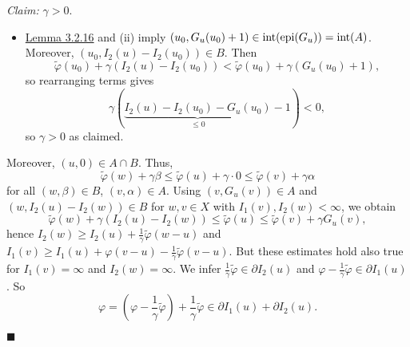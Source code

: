 \begin{itemize}
	\textit{Claim:} $\gamma>0$.
	\begin{itemize}
		\item[] \hyperlink{lemma_3_2_16}{Lemma 3.2.16} and (ii) imply $(u_0,G_u(u_0)+1)\in\operatorname{int}\mathopen{}\left(\operatorname{epi}\mathopen{}\left(G_u\right)\mathclose{}\right)\mathclose{}=\operatorname{int}\mathopen{}\left(A\right)\mathclose{}$. Moreover, $(u_0,I_2(u)-I_2(u_0))\in B$. Then
		\[\tilde{\varphi}(u_0)+\gamma(I_2(u)-I_2(u_0))<\tilde{\varphi}(u_0)+\gamma(G_u(u_0)+1),\]
		so rearranging terms gives
		\[\gamma(\underbrace{I_2(u)-I_2(u_0)-G_u(u_0)}_{\leq0}-1)<0,\]
		so $\gamma>0$ as claimed.
	\end{itemize}

	Moreover, $(u,0)\in A\cap B$. Thus,
	\[\tilde{\varphi}(w)+\gamma\beta\leq\tilde{\varphi}(u)+\gamma\cdot0\leq\tilde{\varphi}(v)+\gamma\alpha\]
	for all $(w,\beta)\in B$, $(v,\alpha)\in A$. Using $(v,G_u(v))\in A$ and $(w,I_2(u)-I_2(w))\in B$ for $w,v\in X$ with $I_1(v),I_2(w)<\infty$, we obtain
	\[\tilde{\varphi}(w)+\gamma(I_2(u)-I_2(w))\leq\tilde{\varphi}(u)\leq\tilde{\varphi}(v)+\gamma G_u(v),\]
	hence $I_2(w)\geq I_2(u)+\frac{1}{\gamma}\tilde{\varphi}(w-u)$ and $I_1(v)\geq I_1(u)+\varphi(v-u)-\frac{1}{\gamma}\tilde{\varphi}(v-u)$. But these estimates hold also true for $I_1(v)=\infty$ and $I_2(w)=\infty$. We infer $\frac{1}{\gamma}\tilde{\varphi}\in\partial I_2(u)$ and $\varphi-\frac{1}{\gamma}\tilde{\varphi}\in\partial I_1(u)$. So
	\[\varphi=\left(\varphi-\frac{1}{\gamma}\tilde{\varphi}\right)+\frac{1}{\gamma}\tilde{\varphi}\in\partial I_1(u)+\partial I_2(u).\]
\end{itemize}
\hfill$\blacksquare$